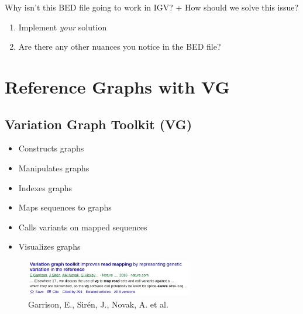 \documentclass[
]{book}
\providecommand{\tightlist}{%
  \setlength{\itemsep}{0pt}\setlength{\parskip}{0pt}}
\begin{document}
Why isn't this BED file going to work in IGV?
+ How should we solve this issue?

\begin{enumerate}
\def\labelenumi{\arabic{enumi}.}
\setcounter{enumi}{3}
\tightlist
\item
  Implement \emph{your} solution
\item
  Are there any other nuances you notice in the BED file?
\end{enumerate}

\hypertarget{reference-graphs-with-vg}{%
\chapter{Reference Graphs with VG}\label{reference-graphs-with-vg}}

\hypertarget{variation-graph-toolkit-vg}{%
\section{Variation Graph Toolkit (VG)}\label{variation-graph-toolkit-vg}}

\begin{itemize}
\tightlist
\item
  Constructs graphs
\item
  Manipulates graphs
\item
  Indexes graphs
\item
  Maps sequences to graphs
\item
  Calls variants on mapped sequences
\item
  Visualizes graphs
\end{itemize}

\begin{figure}
\centering
\includegraphics[width=0.65\textwidth,height=\textheight]{./Figures/VGref.png}
\caption{Garrison, E., Sirén, J., Novak, A. et al.}
\end{figure}
\end{document}
